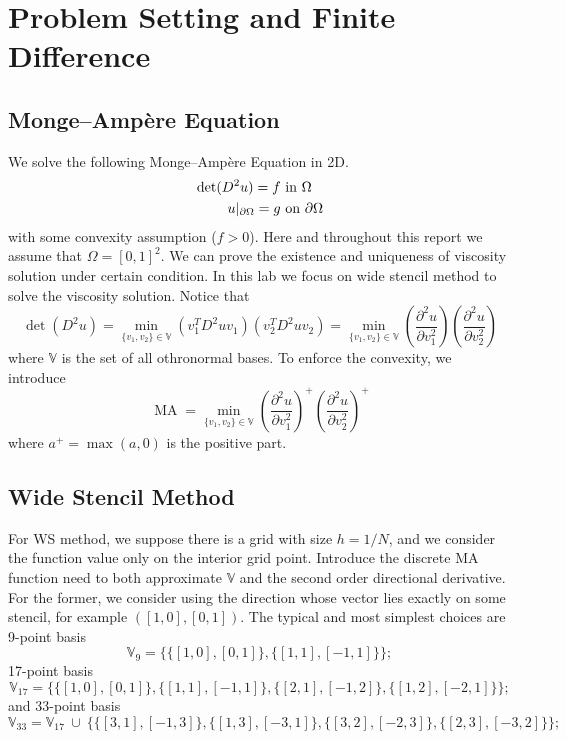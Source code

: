 \documentclass{article}
\DeclareMathOperator{\MA}{MA}
\newcommand{\bV}{\mathbb V}
\begin{document}
	\maketitle
	\thispagestyle{fancy}
	\tableofcontents
	
	\section*{}

\section{Problem Setting and Finite Difference}
\subsection{Monge--Amp\`ere Equation}
We solve the following Monge--Amp\`ere Equation in 2D. 
\begin{align}
\det(D^2u) = f & \text{ in } \Omega\\ 
u|_{\partial \Omega} = g & \text{ on } \partial \Omega
\end{align}
with some convexity assumption ($f>0$). Here and throughout this report we assume that $\Omega = [0,1]^2$. We can prove the existence and uniqueness of viscosity solution under certain condition. In this lab we focus on wide stencil method to solve the viscosity solution. Notice that 
$$\det(D^2 u) = \min_{\{v_1, v_2\} \in \mathbb V} (v_1^TD^2uv_1)(v_2^TD^2uv_2) = \min_{\{v_1, v_2\} \in \mathbb V} (\frac{\partial^2 u}{\partial v_1^2})(\frac{\partial^2 u}{\partial v_2^2})$$
where $\mathbb V$ is the set of all othronormal bases. To enforce the convexity, we introduce 
$$\MA = \min_{\{v_1, v_2\} \in \mathbb V} (\frac{\partial^2 u}{\partial v_1^2})^+(\frac{\partial^2 u}{\partial v_2^2})^+$$
where $a^+ = \max(a,0)$ is the positive part. 

\subsection{Wide Stencil Method}
For WS method, we suppose there is a grid with size $h = 1/N$, and we consider the function value only on the interior grid point. Introduce the discrete MA function need to both approximate $\bV$ and the second order directional derivative. For the former, we consider using the direction whose vector lies exactly on some stencil, for example $([1,0], [0,1])$. The typical and most simplest choices are 9-point basis
$$\bV_9 = \{\{[1,0],[0,1]\},\{[1,1],[-1,1]\}\};$$ 
17-point basis 
$$\bV_{17} = \{\{[1,0],[0,1]\},\{[1,1],[-1,1]\}, \{[2,1],[-1,2]\}, \{[1,2],[-2,1]\}\};$$
and 33-point basis
$$\bV_{33} = \bV_{17}~ \cup ~\{ \{[3,1],[-1,3]\}, \{[1,3],[-3,1]\}, \{[3,2],[-2,3]\}, \{[2,3],[-3,2]\}\};$$
\end{document}
